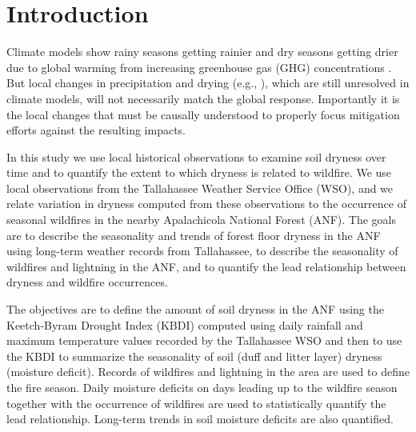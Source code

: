 \documentclass[12pt]{iopart}
\begin{document}
%
\maketitle
% 
%

\section{Introduction}

Climate models show rainy seasons getting rainier and dry seasons getting drier due to global warming from increasing greenhouse gas (GHG) concentrations \citep{ChouEtAl2013}. But local changes in precipitation and drying (e.g., \cite{GossEtAl2020}), which are still unresolved in climate models, will not necessarily match the global response. Importantly it is the local changes that must be causally understood to properly focus mitigation efforts against the resulting impacts.

In this study we use local historical observations to examine soil dryness over time and to quantify the extent to which dryness is related to wildfire. We use local observations from the Tallahassee Weather Service Office (WSO), and we relate variation in dryness computed from these observations to the occurrence of seasonal wildfires in the nearby Apalachicola National Forest (ANF). The goals are to describe the seasonality and trends of forest floor dryness in the ANF using long-term weather records from Tallahassee, to describe the seasonality of wildfires and lightning in the ANF, and to quantify the lead relationship between dryness and wildfire occurrences. 

The objectives are to define the amount of soil dryness in the ANF using the Keetch-Byram Drought Index (KBDI) computed using daily rainfall and maximum temperature values \citep{KeetchByram1968} recorded by the Tallahassee WSO and then to use the KBDI to summarize the seasonality of soil (duff and litter layer) dryness (moisture deficit). Records of wildfires and lightning in the area are used to define the fire season. Daily moisture deficits on days leading up to the wildfire season together with the occurrence of wildfires are used to statistically quantify the lead relationship. Long-term trends in soil moisture deficits are also quantified.
\end{document}
